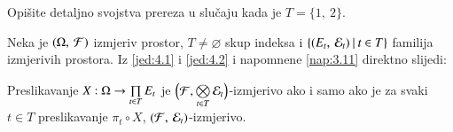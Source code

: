 
\begin{zad} \label{zad:4.8}
    Opi\v site detaljno svojstva prereza u slu\v caju kada je $T = \{1, \: 2\}$.
\end{zad}

Neka je $(\Omega, \: \mathcal{F})$ izmjeriv prostor, $T \neq \varnothing$ skup indeksa i $\{{(E_t, \: \mathcal{E}_t)} \: | \: {t \in T}\}$ familija izmjerivih prostora.
Iz \eqref{jed:4.1} i \eqref{jed:4.2} i napomnene \ref{nap:3.11} direktno slijedi:

\begin{prop} \label{prop:4.9}
    Preslikavanje $X : \Omega \to \prod\limits_{t \in T}^{} E_t$ je $\Big(\mathcal{F},  \bigotimes\limits_{t \in T}^{} \mathcal{E}_t \Big)$-izmjerivo ako i samo ako je za svaki $t \in T$ preslikavanje $\pi_t \circ X$, $(\mathcal{F}, \: \mathcal{E}_t)$-izmjerivo.
\end{prop}

